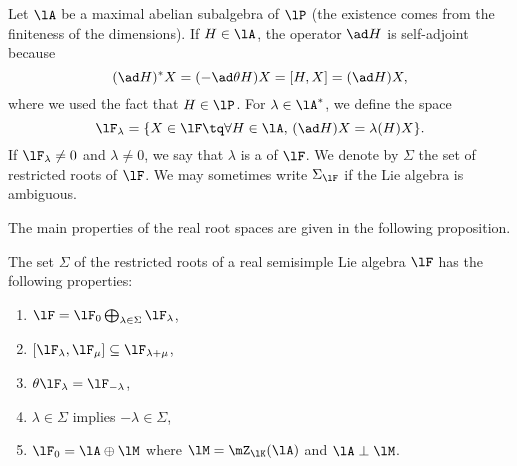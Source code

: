 Let $\lA$ be a maximal abelian subalgebra of $\lP$ (the existence comes from the finiteness of the dimensions). If $H\in\lA$, the operator $\ad H$ is self-adjoint because
\begin{equation}
(\ad H)^*X=(-\ad\theta H)X
          =[H,X]
      =(\ad H)X,
\end{equation}
where we used the fact that $H\in\lP$.  For $\lambda\in\lA^*$, we define the space
\begin{equation}
  \lF_{\lambda}=\{ X\in\lF\tq\forall H\in\lA,\, (\ad H)X=\lambda(H)X\}.
\end{equation}
If $\lF_{\lambda}\neq 0$ and $\lambda\neq 0$, we say that $\lambda$ is a  of $\lF$. We denote by $\Sigma$ the set of restricted roots of $\lF$. We may sometimes write $\Sigma_{\lF}$ if the Lie algebra is ambiguous.

The main properties of the real root spaces are given in the following proposition.

\begin{proposition}     \label{PropPropRacincesReelles}
The set $\Sigma$ of the restricted roots of a real semisimple Lie algebra $\lF$ has the following properties:
\label{prop:enuc}
\begin{enumerate}
\item\label{enuci} $\lF=\lF_0\bigoplus_{\lambda\in\Sigma}\lF_{\lambda}$,
\item\label{enucii} $[\lF_{\lambda},\lF_{\mu}]\subseteq\lF_{\lambda+\mu}$,
\item\label{enuciii} $\theta\lF_{\lambda}=\lF_{-\lambda}$,
\item\label{enuciv} $\lambda\in\Sigma$ implies $-\lambda\in\Sigma$,
\item\label{enucv} $\lF_0=\lA\oplus\lM$ where $\lM=\mZ_{\lK}(\lA)$ and $\lA\perp\lM$.
\end{enumerate}
\end{proposition}

